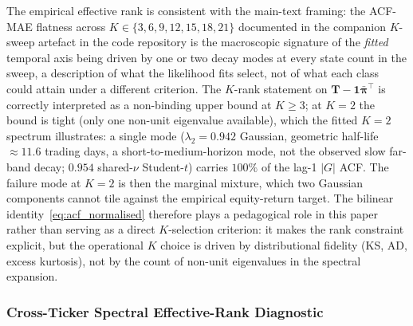 The empirical effective rank is consistent with the main-text framing: the ACF-MAE flatness across $K \in \{3, 6, 9, 12, 15, 18, 21\}$ documented in the companion $K$-sweep artefact in the code repository is the macroscopic signature of the \emph{fitted} temporal axis being driven by one or two decay modes at every state count in the sweep, a description of what the likelihood fits select, not of what each class could attain under a different criterion. The $K$-rank statement on $\mathbf T - \mathbf 1\bar{\boldsymbol\pi}^\top$ is correctly interpreted as a non-binding upper bound at $K \ge 3$; at $K = 2$ the bound is tight (only one non-unit eigenvalue available), which the fitted $K = 2$ spectrum illustrates: a single mode ($\lambda_2 = 0.942$ Gaussian, geometric half-life $\approx 11.6$ trading days, a short-to-medium-horizon mode, not the observed slow far-band decay; $0.954$ shared-$\nu$ Student-$t$) carries $100\%$ of the lag-1 $|G|$ ACF. The failure mode at $K = 2$ is then the marginal mixture, which two Gaussian components cannot tile against the empirical equity-return target. The bilinear identity~\eqref{eq:acf_normalised} therefore plays a pedagogical role in this paper rather than serving as a direct $K$-selection criterion: it makes the rank constraint explicit, but the operational $K$ choice is driven by distributional fidelity (KS, AD, excess kurtosis), not by the count of non-unit eigenvalues in the spectral expansion.

\subsubsection{Cross-Ticker Spectral Effective-Rank Diagnostic}
\label{sec:spectral_rank_xticker}

